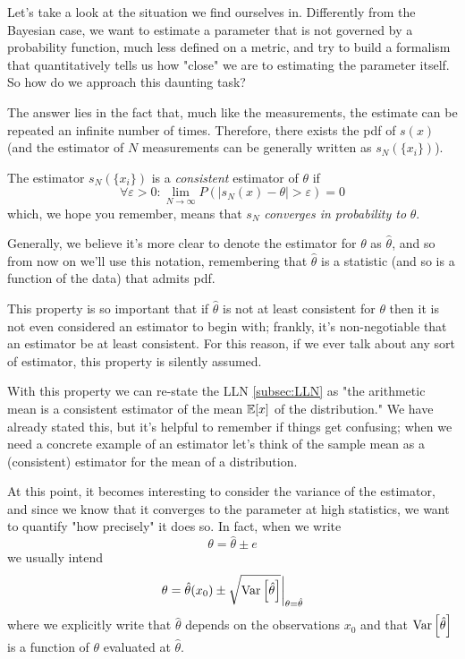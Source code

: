 Let's take a look at the situation we find ourselves in. Differently from the Bayesian case, we want to estimate a parameter that is not governed by a probability function, much less defined on a metric, and try to build a formalism that quantitatively tells us how "close" we are to estimating the parameter itself. So how do we approach this daunting task?

The answer lies in the fact that, much like the measurements, the estimate can be repeated an infinite number of times. Therefore, there exists the pdf of $s(x)$ (and the estimator of $N$ measurements can be generally written as $s_N(\{x_i\})$). 
\begin{definition}
	The estimator $s_N(\{x_i\})$ is a \emph{consistent} estimator of $\theta$ if
	\[
	\forall \varepsilon > 0: \lim_{N\to\infty} P(|s_N(x)-\theta|>\varepsilon)=0
	\]
	which, we hope you remember, means that $s_N$ \emph{converges in probability to} $\theta$.
\label{def:consistent_estimator}
\end{definition}

Generally, we believe it's more clear to denote the estimator for $\theta$ as $\hat{\theta}$, and so from now on we'll use this notation, remembering that $\hat{\theta}$ is a statistic (and so is a function of the data) that admits pdf.

This property is so important that if $\hat{\theta}$ is not at least consistent for $\theta$ then  it is not even considered an estimator to begin with; frankly, it's non-negotiable that an estimator be at least consistent. For this reason, if we ever talk about any sort of estimator, this property is silently assumed. 

With this property we can re-state the LLN \ref{subsec:LLN} as "the arithmetic mean is a consistent estimator of the mean $\mathbb{E}[x]$ of the distribution." We have already stated this, but it's helpful to remember if things get confusing; when we need a concrete example of an estimator let's think of the sample mean as a (consistent) estimator for the mean of a distribution.

At this point, it becomes interesting to consider the variance of the estimator, and since we know that it converges to the parameter at high statistics, we want to quantify "how precisely" it does so. In fact, when we write 
	\[
	\theta = \hat{\theta} \pm e
	\]
we usually intend 
	\[
	\theta = \hat{\theta}(x_0) \pm \sqrt{\operatorname{Var}\left[\hat\theta\right]}\bigg\rvert_{\theta=\hat{\theta}}	
	\]
where we explicitly write that $\hat{\theta}$ depends on the observations $x_0$ and that $\operatorname{Var}\left[\hat\theta\right]$ is a function of $\theta$ evaluated at $\hat{\theta}$.

